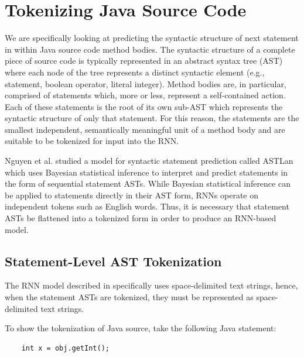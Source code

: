 \documentclass{article}
\begin{document}


\section{Tokenizing Java Source Code}

We are specifically looking at predicting the syntactic structure  of next 
statement in within Java source code method bodies. The syntactic structure 
of a complete piece of source code is typically represented in an abstract 
syntax tree (AST) where each node of the tree represents a distinct 
syntactic element (e.g., statement, boolean operator, literal integer). 
Method bodies are, in particular, comprised of statements which, more or 
less, represent a self-contained action. Each of these statements is the 
root of its own sub-AST which represents the syntactic structure of only 
that statement. For this reason, the statements are the smallest 
independent, semantically meaningful unit of a method body and are suitable 
to be tokenized for input into the RNN.

Nguyen et al. \cite{Nguyen} studied a model for syntactic statement prediction 
called ASTLan which uses Bayesian statistical inference to interpret and 
predict statements in the form of sequential statement ASTs. While Bayesian 
statistical inference can be applied to statements directly in their AST 
form, RNNs operate on independent tokens such as English words. Thus, it is 
necessary that statement ASTs be flattened into a tokenized form in order to 
produce an RNN-based model.

\subsection{Statement-Level AST Tokenization}

The RNN model described in \citet{LSTMArticle} specifically uses space-delimited 
text strings, hence, when the statement ASTs are tokenized, they 
must be represented as space-delimited text strings.

To show the tokenization of Java source, take the following Java statement:

\begin{verbatim}
    int x = obj.getInt();
\end{verbatim}
\end{document}
